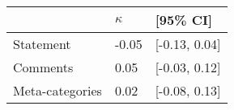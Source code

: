 \begin{tabular}{lll}
\hline
 & $\kappa$ & [95\% CI]  \\
\hline
Statement & -0.05 & [-0.13, 0.04] \\
Comments & 0.05 & [-0.03, 0.12] \\
Meta-categories & 0.02 & [-0.08, 0.13] \\
\hline
\end{tabular}
